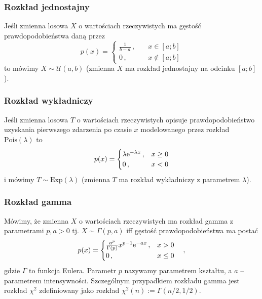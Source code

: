 \documentclass{myclass}
\begin{document}
\subsubsection{Rozkład jednostajny}
Jeśli zmienna losowa \(X\) o wartościach rzeczywistych ma gęstość prawdopodobieństwa daną przez
\begin{equation*}
    p(x) = \begin{cases}
        \frac{1}{b - a}\,,\quad &x \in [a;b]\\
        0\,, &x \notin [a;b]
    \end{cases}
\end{equation*}
to mówimy \(X \sim \mathcal{U}(a,b)\) (zmienna \(X\) ma rozkład jednostajny na odcinku \([a;b]\)).

\subsubsection{Rozkład wykładniczy}
Jeśli zmienna losowa \(T\) o wartościach rzeczywistych opisuje prawdopodobieństwo uzyskania
pierwszego zdarzenia po czasie \(x\) modelowanego przez rozkład \(\text{Pois}(\lambda)\) to
\begin{equation*}
    p(x) = \begin{cases}
        \lambda \mathrm{e}^{-\lambda x}\,, &x \geq 0\\
        0\,, &x < 0 
    \end{cases}
\end{equation*}
i mówimy \(T \sim \text{Exp}(\lambda)\) (zmienna \(T\) ma rozkład wykładniczy z parametrem
\(\lambda\)).

\subsubsection{Rozkład gamma}
Mówimy, że zmienna \(X\) o wartościach rzeczywistych ma rozkład gamma z parametrami \(p, a > 0\) tj.
\(X \sim \Gamma(p, a)\) iff gęstość prawdopodobieństwa ma postać
\begin{equation*}
    p(x) = \begin{cases}
        \frac{a^p}{\Gamma(p)}x^{p-1}\mathrm{e}^{-ax}\,, &x > 0\\
        0\,, &x \leq 0
    \end{cases}\quad,
\end{equation*}
gdzie \(\Gamma\) to funkcja Eulera. Parametr \(p\) nazywamy parametrem kształtu, a \(a\) --
parametrem intensywności. Szczególnym przypadkiem rozkładu gamma jest rozkład \(\chi^2\)
zdefiniowany jako rozkład \(\chi^2(n) := \Gamma(n/2, 1/2)\).
\end{document}
